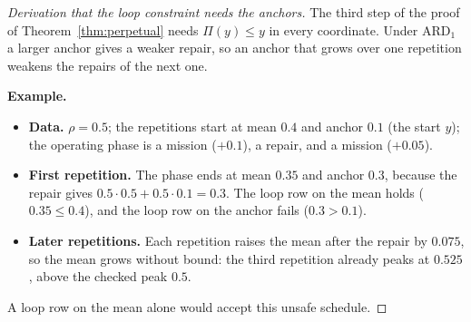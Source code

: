 \documentclass[11pt,a4paper]{article}
\theoremstyle{plain}
\theoremstyle{definition}
\theoremstyle{remark}
\begin{document}
\label{drv:anchor_loop}
\begin{proof}[Derivation that the loop constraint needs the anchors]
The third step of the proof of Theorem~\ref{thm:perpetual} needs $\Pi(y) \le y$ in every coordinate.
Under $\text{ARD}_1$ a larger anchor gives a weaker repair, so an anchor that grows over one repetition weakens the repairs of the next one.
\begin{examplebox}
\textbf{Example.}
\begin{itemize}
  \item \textbf{Data.} $\rho = 0.5$; the repetitions start at mean $0.4$ and anchor $0.1$ (the start $y$); the operating phase is a mission ($+0.1$), a repair, and a mission ($+0.05$).
  \item \textbf{First repetition.} The phase ends at mean $0.35$ and anchor $0.3$, because the repair gives $0.5 \cdot 0.5 + 0.5 \cdot 0.1 = 0.3$.
    The loop row on the mean holds ($0.35 \le 0.4$), and the loop row on the anchor fails ($0.3 > 0.1$).
  \item \textbf{Later repetitions.} Each repetition raises the mean after the repair by $0.075$, so the mean grows without bound: the third repetition already peaks at $0.525$, above the checked peak $0.5$.
\end{itemize}
\end{examplebox}
A loop row on the mean alone would accept this unsafe schedule.
\end{proof}
\end{document}
